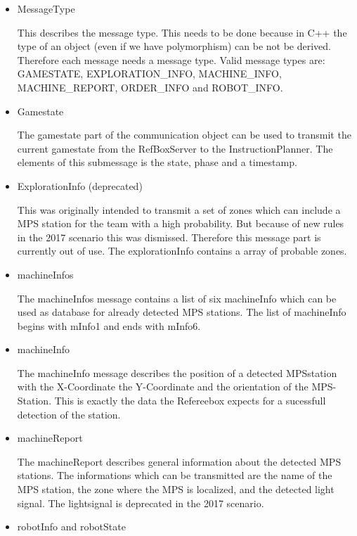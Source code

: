 \begin{itemize}

\item MessageType

This describes the message type. This needs to be done because in C++ the type of an object (even if we have polymorphism) can be not be derived. Therefore each message needs a message type. Valid message types are: GAMESTATE, EXPLORATION\_INFO, MACHINE\_INFO, MACHINE\_REPORT, ORDER\_INFO and 
ROBOT\_INFO. 

\item Gamestate

The gamestate part of the communication object can be used to transmit the current gamestate from the RefBoxServer to the InstructionPlanner. The elements of this submessage is the state, phase and a timestamp. 

\item ExplorationInfo (deprecated)

This was originally intended to transmit a set of zones which can include a MPS station for the team with a high probability. But because of new rules in the 2017 scenario this was dismissed. Therefore this message part is currently out of use. The explorationInfo contains a array of probable zones. 


\item machineInfos

The machineInfos message contains a list of six machineInfo which can be used as database for already detected MPS stations. The list of machineInfo begins with mInfo1 and ends with mInfo6.

\item machineInfo

The machineInfo message describes the position of a detected MPSstation with the X-Coordinate the Y-Coordinate and the orientation of the MPS-Station. This is exactly the data the Refereebox expects for a sucessfull detection of the station.


\item machineReport


The machineReport describes general information about the detected MPS stations. The informations which can be transmitted are the name of the MPS station, the zone where the MPS is localized, and the detected light signal. The lightsignal is deprecated in the 2017 scenario. 

\item robotInfo and robotState


\end{itemize}
